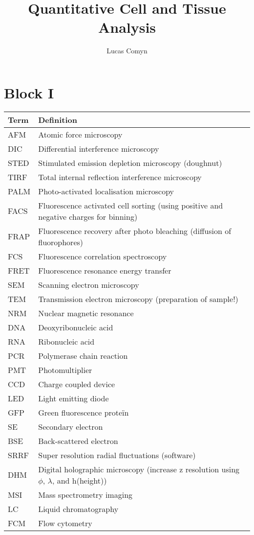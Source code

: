 \documentclass{article}
\title{Quantitative Cell and Tissue Analysis}
\author{Lucas Comyn}
\begin{document}
\maketitle


\section{Block I}
 
\begin{table}[h]
\centering
\begin{tabular}{|l|l|}
\hline
\textbf{Term} & \textbf{Definition} \\ \hline
AFM & Atomic force microscopy \\ \hline
DIC & Differential interference microscopy \\ \hline
STED & Stimulated emission depletion microscopy (doughnut) \\ \hline
TIRF & Total internal reflection interference microscopy \\ \hline
PALM & Photo-activated localisation microscopy \\ \hline
FACS & Fluorescence activated cell sorting (using positive and negative charges for binning) \\ \hline
FRAP & Fluorescence recovery after photo bleaching (diffusion of fluorophores) \\ \hline
FCS & Fluorescence correlation spectroscopy \\ \hline
FRET & Fluorescence resonance energy transfer \\ \hline
SEM & Scanning electron microscopy \\ \hline
TEM & Transmission electron microscopy (preparation of sample!) \\ \hline
NRM & Nuclear magnetic resonance \\ \hline
DNA & Deoxyribonucleic acid \\ \hline
RNA & Ribonucleic acid \\ \hline
PCR & Polymerase chain reaction \\ \hline
PMT & Photomultiplier \\ \hline
CCD & Charge coupled device \\ \hline
LED & Light emitting diode \\ \hline
GFP & Green fluorescence proteïn \\ \hline
SE & Secondary electron \\ \hline
BSE & Back-scattered electron \\ \hline
SRRF & Super resolution radial fluctuations (software) \\ \hline
DHM & Digital holographic microscopy (increase z resolution using $\phi$, $\lambda$, and h(height)) \\ \hline
MSI & Mass spectrometry imaging \\ \hline
LC & Liquid chromatography \\ \hline
FCM & Flow cytometry \\ \hline

\end{tabular}
\end{table}
\end{document}
